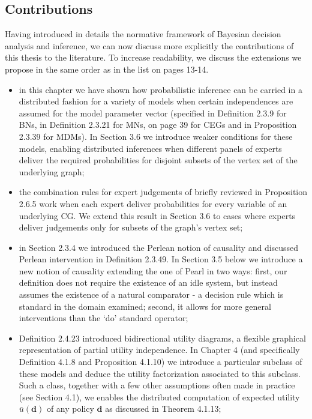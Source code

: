 \subsection{Contributions}
Having introduced in details the normative framework of Bayesian decision analysis and inference, we can now discuss more explicitly the contributions of this thesis to the literature. To increase readability, we discuss the extensions we propose in the same order as in the list on pages 13-14.
\begin{itemize}
\item in this chapter we have shown how probabilistic inference can be carried in a distributed fashion for a variety of models when certain independences are assumed for the model parameter vector (specified in Definition 2.3.9 for BNs, in Definition 2.3.21 for MNs, on page 39 for CEGs and in Proposition 2.3.39 for MDMs). In Section 3.6 we introduce weaker conditions for these models, enabling distributed inferences when different panels of experts deliver the required probabilities for disjoint subsets of the vertex set of the underlying graph;
\item  the combination rules for expert judgements of \citet{Faria1997} briefly reviewed in Proposition 2.6.5 work when each expert deliver probabilities for every variable of an underlying CG. We extend this result in Section 3.6 to cases where experts deliver judgements only for subsets of the graph's vertex set;
\item in Section 2.3.4 we introduced the Perlean notion of causality and discussed Perlean intervention in Definition 2.3.49. In Section 3.5 below we introduce a new notion of causality extending the one of Pearl in two ways: first, our definition does not require the existence of an idle system, but instead assumes the existence of a natural comparator - a decision rule which is standard in the domain examined;  second, it allows for more general interventions than the \lq{d}o\rq \;  standard operator;
\item Definition 2.4.23 introduced bidirectional utility diagrams, a flexible graphical representation of partial utility independence. In Chapter 4 (and specifically Definition 4.1.8 and Proposition 4.1.10) we introduce a particular subclass of these models and deduce the utility factorization associated to this subclass. Such a class, together with a few other assumptions often made in practice (see Section 4.1), we enables the distributed computation of expected utility $\bar{u}(\bm{d})$ of any policy $\bm{d}$ as discussed in Theorem 4.1.13;

\end{itemize}
